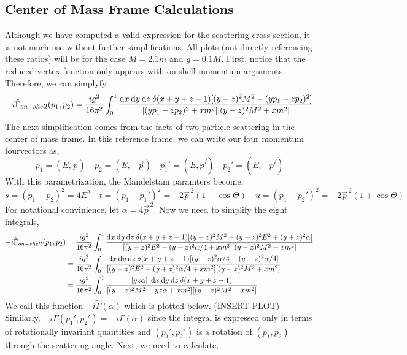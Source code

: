 \documentclass{article}
\begin{document}
\subsection{Center of Mass Frame Calculations}

Although we have computed a valid expression for the scattering cross section, it is not much use without further simplifications. All plots (not directly referencing these ratios) will be for the case $M = 2.1 m$ and $g = 0.1 M$. First, notice that the reduced vertex function only appears with on-shell momentum arguments. Therefore, we can simplyfy,
\[ - i \tilde{\Gamma}_{on-shell}(p_1, p_2) = \frac{i g^2}{16 \pi^2} \int_0^1 \frac{\mathrm{d}x \: \mathrm{d}y \: \mathrm{d}z \: \delta(x + y + z - 1) [(y - z)^2 M^2 - (y p_1 - zp_2)^2]}{[(y p_1 - z p_2)^2 + x m^2][(y - z)^2 M^2  + x m^2]} \]
The next simplification comes from the facts of two particle scattering in the center of mass frame. In this reference frame, we can write our four momentum fourvectors as,
\[ p_1 = (E, \vec{p}) \quad p_2 = (E, -\vec{p}) \quad p_1' = (E, \vec{p'}) \quad p_2' = (E, -\vec{p'}) \]
With this parametrization, the Mandelstam paramters become,
\[ s = (p_1 + p_2)^2 = 4 E^2 \quad t = (p_1 - p_1')^2 = -2 \vec{p}^{\, 2} (1 - \cos{\Theta}) \quad u = (p_1 - p_2')^2 = -2 \vec{p}^{\, 2} (1 + \cos{\Theta}) \]
For notational convinience, let $\alpha = 4 \vec{p}^{\, 2}$.
Now we need to simplify the eight integrals,
\begin{align*} 
- i \tilde{\Gamma}_{on-shell}(p_1, p_2) &= \frac{i g^2}{16 \pi^2} \int_0^1 \frac{\mathrm{d}x \: \mathrm{d}y \: \mathrm{d}z \: \delta(x + y + z - 1) [(y - z)^2 M^2 - (y - z)^2 E^2 + (y + z)^2 \alpha]}{[(y - z)^2 E^2 - (y + z)^2 \alpha/4 + x m^2][(y - z)^2 M^2  + x m^2]} 
\\
& = \frac{i g^2}{16 \pi^2} \int_0^1 \frac{\mathrm{d}x \: \mathrm{d}y \: \mathrm{d}z \: \delta(x + y + z - 1) [ (y + z)^2 \alpha/4 - (y - z)^2 \alpha/4 ]}{[(y - z)^2 E^2 - (y + z)^2 \alpha/4 + x m^2][(y - z)^2 M^2  + x m^2]}
\\
& = \frac{i g^2}{16 \pi^2} \int_0^1 \frac{[yz \alpha] \: \: \mathrm{d}x \: \mathrm{d}y \: \mathrm{d}z \: \delta(x + y + z - 1) }{[(y - z)^2 M^2 - yz \alpha + x m^2][(y - z)^2 M^2  + x m^2]}
\end{align*}
We call this function $- i \tilde{\Gamma}(\alpha)$ which is plotted below.
(INSERT PLOT)
Similarly, $-i \tilde{\Gamma}(p_1', p_2') = -i \tilde{\Gamma}(\alpha)$ since the integral is expressed only in terms of rotationally invariant quantities and $(p_1', p_2')$ is a rotation of $(p_1, p_2)$ through the scattering angle. Next, we need to calculate, 
\end{document}
